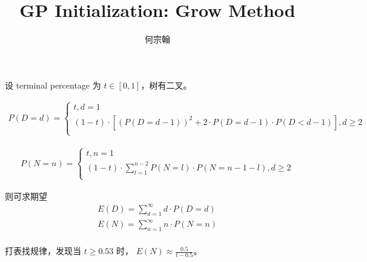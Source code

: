 \documentclass[onecolumn]{ctexart}
\title{GP Initialization: Grow Method}
\author{何宗翰}
\begin{document}
\maketitle


设 terminal percentage 为 $t \in [0,1]$，树有二叉。

\begin{equation}
    \begin{aligned}
        P(D=d) = 
        \begin{cases}
            t,  d=1 \\
            (1-t) \cdot [(P(D = d-1))^2 + 2 \cdot P(D = d-1) \cdot P(D < d-1)],  d \geq 2 \\
        \end{cases}
    \end{aligned}
\end{equation}

\begin{equation}
    \begin{aligned}
        P(N=n) = 
        \begin{cases}
            t,  n=1 \\
            (1-t) \cdot \sum_{l=1}^{n-2} P(N=l) \cdot P(N=n-1-l),  d \geq 2 \\
        \end{cases}
    \end{aligned}
\end{equation}

则可求期望
\begin{equation}
    \begin{aligned}
        E(D) = \sum_{d=1}^{\infty} d \cdot P(D=d) \\
        E(N) = \sum_{n=1}^{\infty} n \cdot P(N=n) \\
    \end{aligned}
\end{equation}

打表找规律，发现当 $t\geq 0.53$ 时， $E(N) \approx \frac{0.5}{t - 0.5}$。
\begin{equation}
    \begin{aligned}
    \end{aligned}
\end{equation}


\begin{equation}
    \begin{aligned}
    \end{aligned}
\end{equation}
\end{document}
